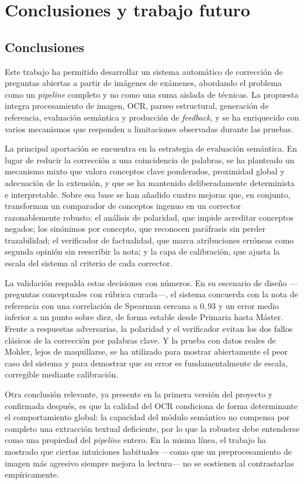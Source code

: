 \chapter{Conclusiones y trabajo futuro}
\label{cap:conclusiones}

\section{Conclusiones}

Este trabajo ha permitido desarrollar un sistema automático de corrección de preguntas abiertas a partir de imágenes de exámenes, abordando el problema como un \emph{pipeline} completo y no como una suma aislada de técnicas. La propuesta integra procesamiento de imagen, OCR, parseo estructural, generación de referencia, evaluación semántica y producción de \emph{feedback}, y se ha enriquecido con varios mecanismos que responden a limitaciones observadas durante las pruebas.

La principal aportación se encuentra en la estrategia de evaluación semántica. En lugar de reducir la corrección a una coincidencia de palabras, se ha planteado un mecanismo mixto que valora conceptos clave ponderados, proximidad global y adecuación de la extensión, y que se ha mantenido deliberadamente determinista e interpretable. Sobre esa base se han añadido cuatro mejoras que, en conjunto, transforman un comparador de conceptos ingenuo en un corrector razonablemente robusto: el análisis de polaridad, que impide acreditar conceptos negados; los sinónimos por concepto, que reconocen paráfrasis sin perder trazabilidad; el verificador de factualidad, que marca atribuciones erróneas como segunda opinión sin reescribir la nota; y la capa de calibración, que ajusta la escala del sistema al criterio de cada corrector.

La validación respalda estas decisiones con números. En su escenario de diseño —preguntas conceptuales con rúbrica curada—, el sistema concuerda con la nota de referencia con una correlación de Spearman cercana a $0{,}93$ y un error medio inferior a un punto sobre diez, de forma estable desde Primaria hasta Máster. Frente a respuestas adversarias, la polaridad y el verificador evitan los dos fallos clásicos de la corrección por palabras clave. Y la prueba con datos reales de Mohler, lejos de maquillarse, se ha utilizado para mostrar abiertamente el peor caso del sistema y para demostrar que su error es fundamentalmente de escala, corregible mediante calibración.

Otra conclusión relevante, ya presente en la primera versión del proyecto y confirmada después, es que la calidad del OCR condiciona de forma determinante el comportamiento global: la capacidad del módulo semántico no compensa por completo una extracción textual deficiente, por lo que la robustez debe entenderse como una propiedad del \emph{pipeline} entero. En la misma línea, el trabajo ha mostrado que ciertas intuiciones habituales —como que un preprocesamiento de imagen más agresivo siempre mejora la lectura— no se sostienen al contrastarlas empíricamente.

